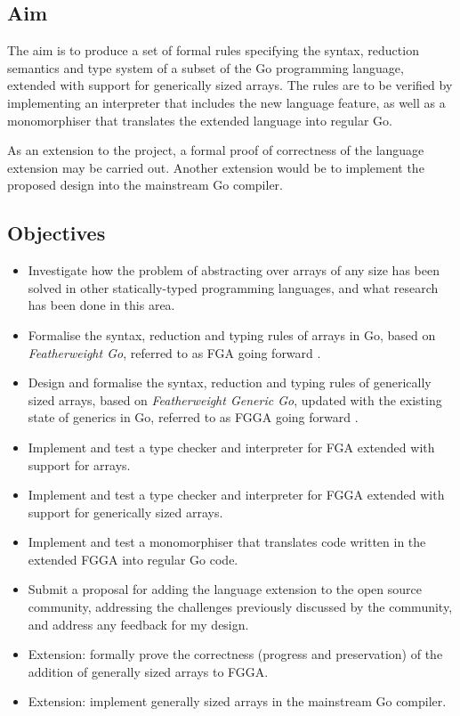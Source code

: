 \subsection{Aim}

The aim is to produce a set of formal rules specifying the syntax, reduction
semantics and type system of a subset of the Go programming language, extended
with support for generically sized arrays. The rules are to be verified by
implementing an interpreter that includes the new language feature, as well
as a monomorphiser that translates the extended language into regular Go.

As an extension to the project, a formal proof of correctness of the language
extension may be carried out. Another extension would be to implement the
proposed design into the mainstream Go compiler.

\subsection{Objectives}

\begin{itemize}
      \item Investigate how the problem of abstracting over arrays of any size
            has been solved in other statically-typed programming languages, and
            what research has been done in this area.
      \item Formalise the syntax, reduction and typing rules of arrays in Go,
            based on \emph{Featherweight Go}, referred to as FGA going forward
            \autocite{fg}.
      \item Design and formalise the syntax, reduction and typing rules of
            generically sized arrays, based on \emph{Featherweight Generic Go},
            updated with the existing state of generics in Go, referred to as
            FGGA going forward \autocite{fg}.
      \item Implement and test a type checker and interpreter for FGA extended
            with support for arrays.
      \item Implement and test a type checker and interpreter for FGGA extended
            with support for generically sized arrays.
      \item Implement and test a monomorphiser that translates code written in
            the extended FGGA into regular Go code.
      \item Submit a proposal for adding the language extension to the open
            source community, addressing the challenges previously discussed by
            the community, and address any feedback for my design.
      \item Extension: formally prove the correctness (progress and
            preservation) of the addition of generally sized arrays to FGGA.
      \item Extension: implement generally sized arrays in the mainstream Go
            compiler.
\end{itemize}

